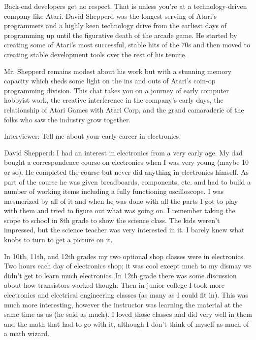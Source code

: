 Back-end developers get no respect. That is unless you’re at a technology-driven company like Atari. David Shepperd was the longest serving of Atari’s programmers and a highly keen technology drive from the earliest days of programming up until the figurative death of the arcade game. He started by creating some of Atari’s most successful, stable hits of the 70s and then moved to creating stable development tools over the rest of his tenure.

Mr. Shepperd remains modest about his work but with a stunning memory capacity which sheds some light on the ins and outs of Atari’s coin-op programming division. This chat takes you on a journey of early computer hobbyist work, the creative interference in the company’s early days, the relationship of Atari Games with Atari Corp, and the grand camaraderie of the folks who saw the industry grow together.

\noindent\makebox[\linewidth]{\rule{\paperwidth}{0.4pt}}

\textcolor{interviewer}{Interviewer:} Tell me about your early career in electronics.

\textcolor{interviewee}{David Shepperd:} I had an interest in electronics from a very early age. My dad bought a correspondence course on electronics when I was very young (maybe 10 or so). He completed the course but never did anything in electronics himself. As part of the course he was given breadboards, components, etc. and had to build a number of working items including a fully functioning oscilloscope. I was mesmerized by all of it and when he was done with all the parts I got to play with them and tried to figure out what was going on. I remember taking the scope to school in 8th grade to show the science class. The kids weren't impressed, but the science teacher was very interested in it. I barely knew what knobs to turn to get a picture on it.

In 10th, 11th, and 12th grades my two optional shop classes were in electronics. Two hours each day of electronics shop; it was cool except much to my dismay we didn't get to learn much electronics. In 12th grade there was some discussion about how transistors worked though. Then in junior college I took more electronics and electrical engineering classes (as many as I could fit in). This was much more interesting, however the instructor was learning the material at the same time as us (he said as much). I loved those classes and did very well in them and the math that had to go with it, although I don't think of myself as much of a math wizard. 

